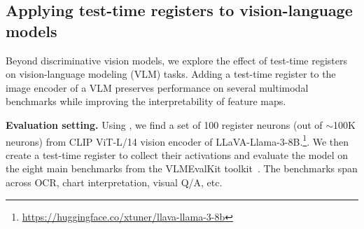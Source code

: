 \documentclass{article}
\begin{document}
\subsection{Applying test-time registers to vision-language models}
\label{section:vlm_results}
Beyond discriminative vision models, we explore the effect of test-time registers on vision-language modeling (VLM) tasks. Adding a test-time register to the image encoder of a VLM preserves performance on several multimodal benchmarks while improving the interpretability of feature maps.




\textbf{Evaluation setting.} Using , we find a set of 100 register neurons (out of ${\sim}$100K neurons) from CLIP ViT-L/14 vision encoder of LLaVA-Llama-3-8B.\footnote{\url{https://huggingface.co/xtuner/llava-llama-3-8b}}. We then create a test-time register to collect their activations and evaluate the model on the eight main benchmarks from the VLMEvalKit toolkit~\citep{duan2024vlmevalkit}. The benchmarks span across OCR, chart interpretation, visual Q/A, etc.


\begin{table}
\centering
\vspace{-0.4cm}
\caption{\textbf{Adding a test-time register maintains overall performance across multi-modal tasks.}} 
\vspace{-0.4cm}
\label{tab:vlm_comparison}
\end{table}
\end{document}

